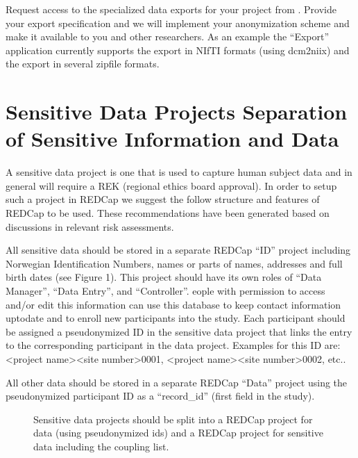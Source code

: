 \documentclass[letterpaper,10pt,english]{sphinxmanual}
\begin{document}
\sphinxAtStartPar
Request access to the specialized data exports for your project from . Provide your export specification and we will implement your anonymization scheme and make it available to you and other researchers. As an example the “Export” application currently supports the export in NIfTI formats (using dcm2niix) and the export in several zip\sphinxhyphen{}file formats.


\section{Sensitive Data Projects \textendash{} Separation of Sensitive Information and Data}
\label{\detokenize{ServerAdmin/admin:sensitive-data-projects-separation-of-sensitive-information-and-data}}
\sphinxAtStartPar
A sensitive data project is one that is used to capture human subject data and in general will require a REK (regional ethics board approval). In order to setup such a project in REDCap we suggest the follow structure and features of REDCap to be used. These recommendations have been generated based on discussions in relevant risk assessments.

\sphinxAtStartPar
All sensitive data should be stored in a separate REDCap “ID” project including Norwegian Identification Numbers, names or parts of names, addresses and full birth dates (see Figure 1). This project should have its own roles of “Data Manager”, “Data Entry”, and “Controller”.  eople with permission to access and/or edit this information can use this database to keep contact information up\sphinxhyphen{}to\sphinxhyphen{}date and to enroll new participants into the study. Each participant should be assigned a pseudonymized ID in the sensitive data project that links the entry to the corresponding participant in the data project. Examples for this ID are: \textless{}project name\textgreater{}\sphinxhyphen{}\textless{}site number\textgreater{}\sphinxhyphen{}0001, \textless{}project name\textgreater{}\sphinxhyphen{}\textless{}site number\textgreater{}\sphinxhyphen{}0002, etc..

\sphinxAtStartPar
All other data should be stored in a separate REDCap “Data” project using the pseudonymized participant ID as a “record\_id” (first field in the study).

\begin{figure}[htbp]
\centering
\capstart

\noindent{}
\caption{Sensitive data projects should be split into a REDCap project for data (using pseudonymized ids) and a REDCap project for sensitive data including the coupling list.}\label{\detokenize{ServerAdmin/admin:id1}}\end{figure}
\end{document}

